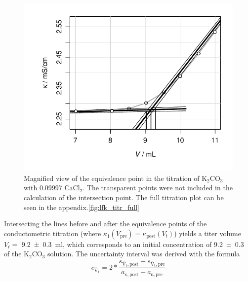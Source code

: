 \begin{figure}[H]
    \centering
    \includegraphics[width=.5\textwidth]{figures/plots/lfk_titration_zoom.pdf}
    \caption{Magnified view of the equivalence point in the titration of $\mathrm{K_2CO_3}$ with \qty[round-precision=5]{0.09997}{\M} $\mathrm{CaCl_2}$. The transparent points were not included in the calculation of the intersection point. The full titration plot can be seen in the appendix.\ref{fig:lfk_titr_full}}
    \label{fig:lfk_titr_zoom}
\end{figure}

\columnbreak

Intersecting the lines before and after the equivalence points of the conductometric titration (where $\kappa_1(V_{\mathrm{pre}}) = \kappa_{\mathrm{post}}(V_t)$) yields a titer volume $V_t =$ \qty{9.2 \pm 0.3}{\milli\litre}, which corresponds to an initial concentration of \qty{9.2 \pm 0.3}{\milli\M} of the $\mathrm{K_2CO_3}$ solution. The uncertainty interval was derived with the formula
\begin{equation}
    c_{\mathrm{\overline V_t}} = 2 * 
    \frac{s_{\mathrm{\overline V_t,post}} + s_{\mathrm{\overline V_t,pre}}}{a_{\mathrm{\kappa,post}} - a_{\mathrm{\kappa,pre}}}
\end{equation}

